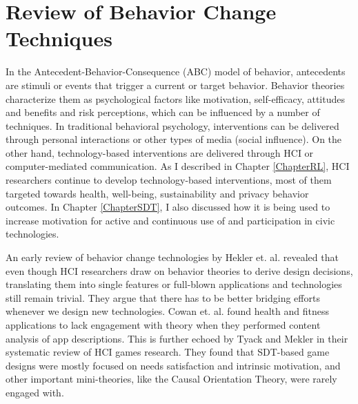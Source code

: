 \section{Review of Behavior Change Techniques}
In the Antecedent-Behavior-Consequence (ABC) model of behavior, antecedents are stimuli or events that trigger a current or target behavior. Behavior theories characterize them as psychological factors like motivation, self-efficacy, attitudes and benefits and risk perceptions, which can be influenced by a number of techniques. In traditional behavioral psychology, interventions can be delivered through personal interactions or other types of media (social influence). On the other hand, technology-based interventions are delivered through HCI or computer-mediated communication. As I described in Chapter \ref{ChapterRL}, HCI researchers continue to develop technology-based interventions, most of them targeted towards health, well-being, sustainability and privacy behavior outcomes. In Chapter \ref{ChapterSDT}, I also discussed how it is being used to increase motivation for active and continuous use of and participation in civic technologies. 

An early review of behavior change technologies by Hekler et. al. revealed that even though HCI researchers draw on behavior theories to derive design decisions, translating them into single features or full-blown applications and technologies still remain trivial\cite{hekler2013mind}. They argue that there has to be better bridging efforts whenever we design new technologies. Cowan et. al. found health and fitness applications to lack engagement with theory when they performed content analysis of app descriptions\cite{cowan2013apps}. This is further echoed by Tyack and Mekler in their systematic review of HCI games research\cite{tyack2020self}. They found that SDT-based game designs were mostly focused on needs satisfaction and intrinsic motivation, and other important mini-theories, like the Causal Orientation Theory, were rarely engaged with. 

